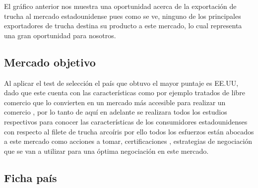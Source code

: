 \documentclass[
  stu,
  floatsintext,
  longtable,
  a4paper,
  nolmodern,
  notxfonts,
  notimes,
  colorlinks=true,linkcolor=blue,citecolor=blue,urlcolor=blue]{apa7}
\begin{document}
El gráfico anterior nos muestra una oportunidad acerca de la exportación
de trucha al mercado estadounidense pues como se ve, ninguno de los
principales exportadores de trucha destina su producto a este mercado,
lo cual representa una gran oportunidad para nosotros.

\subsection{Mercado objetivo}\label{mercado-objetivo}

Al aplicar el test de selección el país que obtuvo el mayor puntaje es
EE.UU, dado que este cuenta con las características como por ejemplo
tratados de libre comercio que lo convierten en un mercado más accesible
para realizar un comercio , por lo tanto de aquí en adelante se
realizara todos los estudios respectivos para conocer las
características de los consumidores estadounidenses con respecto al
filete de trucha arcoíris por ello todos los esfuerzos están abocados a
este mercado como acciones a tomar, certificaciones , estrategias de
negociación que se van a utilizar para una óptima negociación en este
mercado.

\subsection{Ficha país}\label{ficha-pauxeds}
\end{document}
